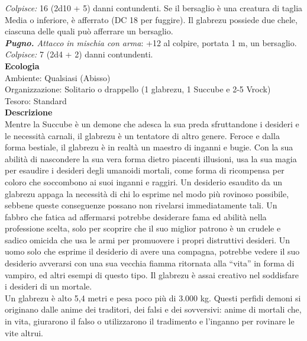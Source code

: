 \begin{multicols}{2}
\emph{Colpisce:} 16 (2d10 + 5) danni contundenti. Se il bersaglio è una creatura di taglia Media o inferiore, è afferrato (DC  18 per fuggire). Il glabrezu possiede due chele, ciascuna delle quali può afferrare un bersaglio.\\
\emph{\textbf{Pugno.} Attacco in mischia con arma}: +12 al colpire, portata 1 m, un bersaglio.\\
\emph{Colpisce:} 7 (2d4 + 2) danni contundenti.\\
\textbf{Ecologia}\\
Ambiente: Qualsiasi (Abisso)\\
Organizzazione: Solitario o drappello (1 glabrezu, 1 Succube e 2-5 Vrock)\\
Tesoro: Standard\\
\textbf{Descrizione}\\
Mentre la Succube è un demone che adesca la sua preda sfruttandone i desideri e le necessità carnali, il glabrezu è un tentatore di altro genere. Feroce e dalla forma bestiale, il glabrezu è in realtà un maestro di inganni e bugie. Con la sua abilità di nascondere la sua vera forma dietro piacenti illusioni, usa la sua magia per esaudire i desideri degli umanoidi mortali, come forma di ricompensa per coloro che soccombono ai suoi inganni e raggiri. Un desiderio esaudito da un glabrezu appaga la necessità di chi lo esprime nel modo più rovinoso possibile, sebbene queste conseguenze possano non rivelarsi immediatamente tali. Un fabbro che fatica ad affermarsi potrebbe desiderare fama ed abilità nella professione scelta, solo per scoprire che il suo miglior patrono è un crudele e sadico omicida che usa le armi per promuovere i propri distruttivi desideri. Un uomo solo che esprime il desiderio di avere una compagna, potrebbe vedere il suo desiderio avverarsi con una sua vecchia fiamma ritornata alla “vita” in forma di vampiro, ed altri esempi di questo tipo. Il glabrezu è assai creativo nel soddisfare i desideri di un mortale.\\
Un glabrezu è alto 5,4 metri e pesa poco più di 3.000 kg. Questi perfidi demoni si originano dalle anime dei traditori, dei falsi e dei sovversivi: anime di mortali che, in vita, giurarono il falso o utilizzarono il tradimento e l'inganno per rovinare le vite altrui.\\


\end{multicols}
